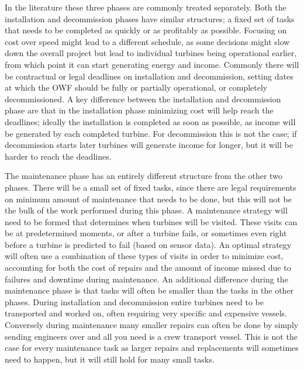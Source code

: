 \documentclass[a4paper,12pt]{article}
\begin{document}
\bigskip

In the literature these three phases are commonly treated separately. Both the installation and decommission phases have similar structures; a fixed set of tasks that needs to be completed as quickly or as profitably as possible. Focusing on cost over speed might lead to a different schedule, as some decisions might slow down the overall project but lead to individual turbines being operational earlier, from which point it can start generating energy and income. Commonly there will be contractual or legal deadlines on installation and decommission, setting dates at which the OWF should be fully or partially operational, or completely decommissioned. A key difference between the installation and decommission phase are that in the installation phase minimizing cost will help reach the deadlines; ideally the installation is completed as soon as possible, as income will be generated by each completed turbine. For decommission this is not the case; if decommission starts later turbines will generate income for longer, but it will be harder to reach the deadlines. 

The maintenance phase has an entirely different structure from the other two phases. There will be a small set of fixed tasks, since there are legal requirements on minimum amount of maintenance that needs to be done, but this will not be the bulk of the work performed during this phase. A maintenance strategy will need to be formed that determines when turbines will be visited. These visits can be at predetermined moments, or after a turbine fails, or sometimes even right before a turbine is predicted to fail (based on sensor data). An optimal strategy will often use a combination of these types of visits in order to minimize cost, accounting for both the cost of repairs and the amount of income missed due to failures and downtime during maintenance. An additional difference during the maintenance phase is that tasks will often be smaller than the tasks in the other phases. During installation and decommission entire turbines need to be transported and worked on, often requiring very specific and expensive vessels. Conversely during maintenance many smaller repairs can often be done by simply sending engineers over and all you need is a crew transport vessel. This is not the case for every maintenance task as larger repairs and replacements will sometimes need to happen, but it will still hold for many small tasks.

\bigskip
\end{document}
